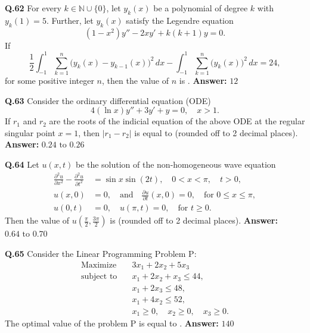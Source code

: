 \documentclass[11pt,a4paper]{article}
\newcommand{\ans}[1]{\textbf{Answer:} #1\par\medskip}
\begin{document}
\textbf{Q.62} For every $k \in \mathbb{N} \cup \{0\}$, let $y_k(x)$ be a polynomial of degree $k$ with $y_k(1) = 5$. Further, let $y_k(x)$ satisfy the Legendre equation
\[
  (1 - x^2)y'' - 2xy' + k(k + 1)y = 0.
\]
If
\[
  \frac{1}{2} \int_{-1}^{1} \sum_{k=1}^{n} \bigl(y_k(x) - y_{k-1}(x)\bigr)^2\,dx - \int_{-1}^{1} \sum_{k=1}^{n} \bigl(y_k(x)\bigr)^2\,dx = 24,
\]
for some positive integer $n$, then the value of $n$ is \underline{\hspace{2cm}}.
\ans{$12$}

\textbf{Q.63} Consider the ordinary differential equation (ODE)
\[
  4(\ln x)y'' + 3y' + y = 0, \quad x > 1.
\]
If $r_1$ and $r_2$ are the roots of the indicial equation of the above ODE at the regular singular point $x = 1$, then $|r_1 - r_2|$ is equal to \underline{\hspace{2cm}} (rounded off to 2 decimal places).
\ans{$0.24 \text{ to } 0.26$}

\textbf{Q.64} Let $u(x, t)$ be the solution of the non-homogeneous wave equation
\begin{align*}
  \frac{\partial^2 u}{\partial x^2} - \frac{\partial^2 u}{\partial t^2} &= \sin x \sin(2t), \quad 0 < x < \pi, \quad t > 0, \\
  u(x, 0) &= 0, \quad \text{and} \quad \frac{\partial u}{\partial t}(x, 0) = 0, \quad \text{for } 0 \le x \le \pi, \\
  u(0, t) &= 0, \quad u(\pi, t) = 0, \quad \text{for } t \ge 0.
\end{align*}
Then the value of $u\!\left(\frac{\pi}{2}, \frac{3\pi}{2}\right)$ is \underline{\hspace{2cm}} (rounded off to 2 decimal places).
\ans{$0.64 \text{ to } 0.70$}

\textbf{Q.65} Consider the Linear Programming Problem P:
\begin{align*}
  \text{Maximize} \quad & 3x_1 + 2x_2 + 5x_3 \\
  \text{subject to} \quad & x_1 + 2x_2 + x_3 \le 44, \\
  & x_1 + 2x_3 \le 48, \\
  & x_1 + 4x_2 \le 52, \\
  & x_1 \ge 0, \quad x_2 \ge 0, \quad x_3 \ge 0.
\end{align*}
The optimal value of the problem P is equal to \underline{\hspace{2cm}}.
\ans{$140$}

\end{document}
